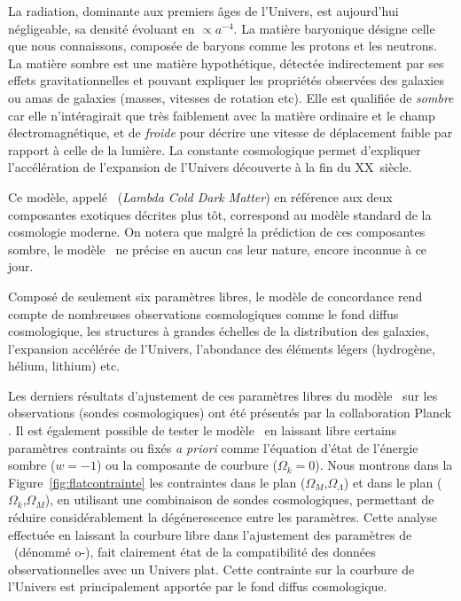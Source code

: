 \documentclass[../main/main.tex]{subfiles}
\begin{document}
La radiation, dominante aux premiers âges de l'Univers, est aujourd'hui
négligeable, sa densité évoluant en $\propto a^{-4}$. La matière baryonique désigne celle que nous
connaissons, composée de baryons comme les protons et les neutrons. La
matière sombre est une matière hypothétique, détectée indirectement par
ses effets gravitationnelles et pouvant expliquer les propriétés
observées des galaxies ou amas de galaxies (masses, vitesses de
rotation etc). Elle est qualifiée de \textit{sombre} car elle n'intéragirait que
très faiblement avec la matière ordinaire et le champ
électromagnétique, et de \textit{froide} pour décrire une vitesse de
déplacement faible par rapport à celle de la lumière. La constante
cosmologique permet d'expliquer l'accélération de l'expansion de
l'Univers découverte à la fin du XX\ieme\ siècle.

Ce modèle, appelé \lcdm\ (\textit{Lambda Cold Dark Matter}) en
référence aux deux composantes exotiques décrites plus tôt,
correspond au modèle standard de la cosmologie moderne. On notera que
malgré la prédiction de ces composantes sombre, le modèle \lcdm\ ne
précise en aucun cas leur nature, encore inconnue à ce jour.

Composé de seulement six paramètres libres, le modèle de concordance
rend compte de nombreuses observations cosmologiques comme le fond
diffus cosmologique, les structures à grandes échelles de la
distribution des galaxies, l'expansion accélérée de l'Univers,
l'abondance des éléments légers (hydrogène, hélium, lithium) etc.

Les derniers résultats d'ajustement de ces paramètres libres du modèle \lcdm\ sur les
observations (sondes cosmologiques) ont été présentés
par la collaboration Planck \citep{Planckparams2018}. Il est également
possible de tester le modèle \lcdm\ en laissant libre certains
paramètres contraints ou fixés \textit{a priori} comme l'équation d'état
de l'énergie sombre ($w=-1$) ou la composante de courbure
($\Omega_{k}=0$).
Nous montrons dans la Figure~\ref{fig:flatcontrainte} les contraintes dans le plan
($\Omega_{M}$,$\Omega_{\Lambda}$) et dans le plan ($\Omega_{k}$,$\Omega_{M}$), en utilisant une combinaison de
sondes cosmologiques, permettant de réduire considérablement la
dégénerescence entre les paramètres. Cette analyse effectuée en laissant
la courbure libre dans l'ajustement des paramètres de \lcdm\ (dénommé o-\lcdm), fait clairement état
de la compatibilité des données observationnelles avec un Univers
plat. Cette contrainte sur la courbure de l'Univers est principalement
apportée par le fond diffus cosmologique. 
\end{document}
